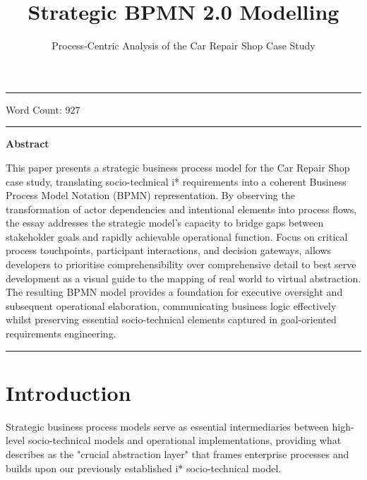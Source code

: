 \documentclass[14pt,a4paper]{article}
\title{Strategic BPMN 2.0 Modelling}
\author{Process-Centric Analysis of the Car Repair Shop Case Study}
\date{}
\begin{document}
\maketitle

\hrule

\vspace{3em}

Word Count: 927

\vspace{3em}
\hrule

\vspace{2em}
\textbf{Abstract}
\vspace{1em}

This paper presents a strategic business process model for the Car Repair Shop case study, translating socio-technical i* requirements into a coherent Business Process Model Notation (BPMN) representation. By observing the transformation of actor dependencies and intentional elements into process flows, the essay addresses the strategic model's capacity to bridge gaps between stakeholder goals and rapidly achievable operational function. Focus on critical process touchpoints, participant interactions, and decision gateways, allows developers to prioritise comprehensibility over comprehensive detail to best serve development as a visual guide to the mapping of real world to virtual abstraction. The resulting BPMN model provides a foundation for executive oversight and subsequent operational elaboration, communicating business logic effectively whilst preserving essential socio-technical elements captured in goal-oriented requirements engineering.

\vspace{3em}
\hrule

\thispagestyle{empty}

\tableofcontents
{}

\newpage


\section{Introduction}

Strategic business process models serve as essential intermediaries between high-level socio-technical models and operational implementations, providing what \textcite[p. 76]{Silver2011} describes as the "crucial abstraction layer" that frames enterprise processes and builds upon our previously established i* socio-technical model.
\end{document}
